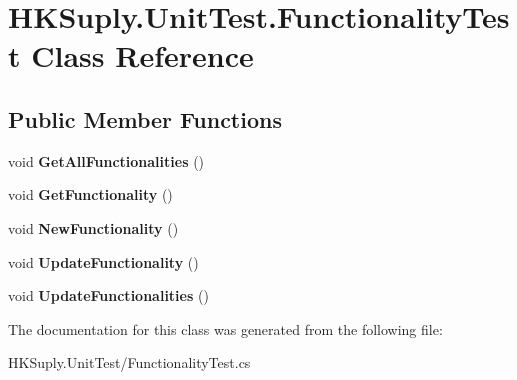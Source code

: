\hypertarget{class_h_k_suply_1_1_unit_test_1_1_functionality_test}{}\section{H\+K\+Suply.\+Unit\+Test.\+Functionality\+Test Class Reference}
\label{class_h_k_suply_1_1_unit_test_1_1_functionality_test}
\subsection*{Public Member Functions}
\begin{DoxyCompactItemize}
\item 
\mbox{\label{class_h_k_suply_1_1_unit_test_1_1_functionality_test_aa8ac51031a1978bb946cc4e2a469b4e3}} 
void {\bfseries Get\+All\+Functionalities} ()
\item 
\mbox{\label{class_h_k_suply_1_1_unit_test_1_1_functionality_test_a7c1c4dbb73d76537cee7110a85011bdb}} 
void {\bfseries Get\+Functionality} ()
\item 
\mbox{\label{class_h_k_suply_1_1_unit_test_1_1_functionality_test_ac8505a9a8bb7353e45e84ab7ee68c8fb}} 
void {\bfseries New\+Functionality} ()
\item 
\mbox{\label{class_h_k_suply_1_1_unit_test_1_1_functionality_test_a7c1c86aff37c2c7d23c8c48e10df6425}} 
void {\bfseries Update\+Functionality} ()
\item 
\mbox{\label{class_h_k_suply_1_1_unit_test_1_1_functionality_test_a641458694dcecd6b3abb008797715491}} 
void {\bfseries Update\+Functionalities} ()
\end{DoxyCompactItemize}


The documentation for this class was generated from the following file\+:\begin{DoxyCompactItemize}
\item 
H\+K\+Suply.\+Unit\+Test/Functionality\+Test.\+cs\end{DoxyCompactItemize}
